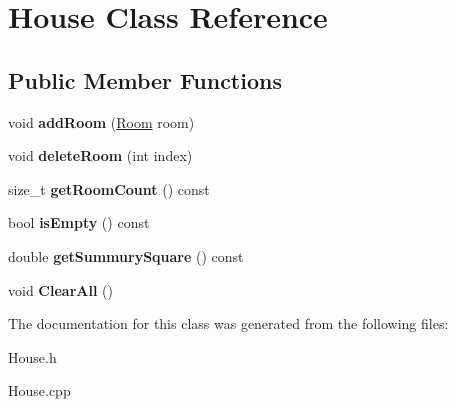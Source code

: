 \hypertarget{class_house}{}\section{House Class Reference}
\label{class_house}
\subsection*{Public Member Functions}
\begin{DoxyCompactItemize}
\item 
\mbox{\label{class_house_a34103c16773b7b0fc825a91f463e82fb}} 
void {\bfseries add\+Room} (\mbox{\hyperlink{class_room}{Room}} room)
\item 
\mbox{\label{class_house_ab3effdfacda266ced2f1e847b96e49e4}} 
void {\bfseries delete\+Room} (int index)
\item 
\mbox{\label{class_house_ab7f00c3b447a9ed771e18cfb907e9585}} 
size\+\_\+t {\bfseries get\+Room\+Count} () const
\item 
\mbox{\label{class_house_a6e664594b2407ae36294feeafbe8d591}} 
bool {\bfseries is\+Empty} () const
\item 
\mbox{\label{class_house_a024343d1dd5196dca6888a968ce2659a}} 
double {\bfseries get\+Summury\+Square} () const
\item 
\mbox{\label{class_house_aff3fbb1a1b8373f8080fac0130c02ee1}} 
void {\bfseries Clear\+All} ()
\end{DoxyCompactItemize}


The documentation for this class was generated from the following files\+:\begin{DoxyCompactItemize}
\item 
House.\+h\item 
House.\+cpp\end{DoxyCompactItemize}
